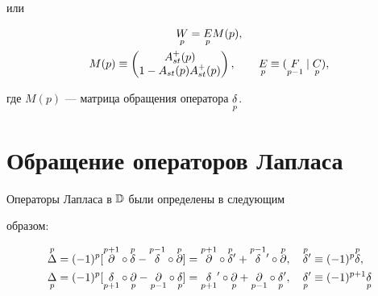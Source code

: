 или 


\begin{gather*} 


\down{p}{W}=\down{p}{E}M(p),\\ 


M(p)\equiv 


\begin{pmatrix} 


A^+_{st}(p) \\ 1-A_{st}(p)A^+_{st}(p) 


\end{pmatrix} 


,\qquad 


\down{p}{E}\equiv(\down{p-1}{F}\mid\down{p}{C}), 


\end{gather*} 


где $M(p)$ --- матрица обращения оператора $\underset{p}{\delta}{}$. 


 


\section{Обращение операторов Лапласа} 


 


Операторы Лапласа в $\Bbb D$ были определены в \cite{2} следующим 


образом: 


\begin{equation} 


\begin{split} 


\up{p}{\Delta}&=(-1)^p[\up{p+1}{\partial}\circ\up{p}{\delta}- 


\up{p-1}{\delta}\circ\up{p}{\partial}]= 


\up{p+1}{\partial}\circ\up{p}{\delta}{}'+ 


\up{p-1}{\delta}{}'\circ\up{p}{\partial},\quad 


\up{p}{\delta}{}'\equiv(-1)^p\up{p}{\delta},\\ 


% 


\down{p}{\Delta}&=(-1)^p[\down{p+1}{\delta}\circ\down{p}{\partial}- 


\down{p-1}{\partial}\circ\down{p}{\delta}]= 


\down{p+1}{\delta}{}'\circ\down{p}{\partial}+ 


\down{p-1}{\partial}\circ\down{p}{\delta}{}',\quad 


\down{p}{\delta}{}'\equiv(-1)^{p+1}\down{p}{\delta}


\end{split} 


\end{equation} 


